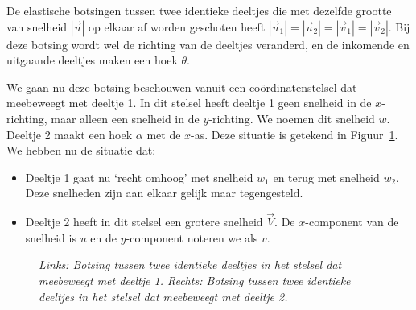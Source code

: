 De elastische botsingen tussen twee identieke deeltjes die met
dezelfde grootte van snelheid $|\vec{u}|$ op elkaar af worden
geschoten heeft
$|\vec{u}_1|=|\vec{u}_2|=|\vec{v}_1|=|\vec{v}_2|$. Bij deze botsing
wordt wel de richting van de deeltjes veranderd, en de inkomende en
uitgaande deeltjes maken een hoek $\theta$.


We gaan nu deze botsing beschouwen vanuit een co\"ordinatenstelsel dat
meebeweegt met deeltje 1. In dit stelsel heeft deeltje 1 geen snelheid in de
$x$-richting, maar alleen een snelheid in de $y$-richting. We noemen dit snelheid $w$.
Deeltje 2
maakt een hoek $\alpha$ met de $x$-as. Deze situatie is getekend in Figuur~\ref{f:bots2}.
We hebben nu de situatie dat:
\begin{itemize}
\item Deeltje 1 gaat nu `recht omhoog' met snelheid $w_1$ en terug met 
snelheid $w_2$. Deze snelheden zijn aan elkaar gelijk maar tegengesteld. 
\item Deeltje 2 heeft in dit stelsel een grotere snelheid
$\vec{V}$. De $x$-component van de snelheid is $u$ en de $y$-component noteren we als $v$.
\end{itemize}
\begin{figure}[ht] 
\centering
\caption{{\sl Links: Botsing tussen twee identieke deeltjes in het stelsel dat meebeweegt met deeltje 1.
Rechts: Botsing tussen twee identieke deeltjes in het stelsel dat meebeweegt met deeltje 2.
\label{f:bots2}}}
\end{figure}


